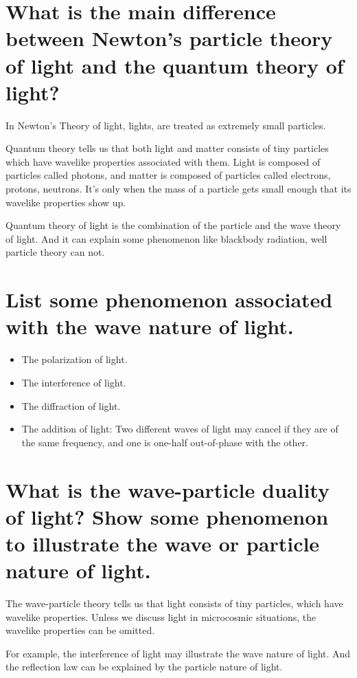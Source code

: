 \documentclass{article}
\begin{document}
\section{What is the main difference between Newton's particle theory of light and the quantum theory of light?}

In Newton's Theory of light, lights, are treated as extremely small particles.

Quantum theory tells us that both light and matter consists of tiny particles which have wavelike properties associated with them. Light is composed of particles called photons, and matter is composed of particles called electrons, protons, neutrons. It's only when the mass of a particle gets small enough that its wavelike properties show up.

Quantum theory of light is the combination of the particle and the wave theory of light. And it can explain some phenomenon like blackbody radiation, well particle theory can not.

\section{List some phenomenon associated with the wave nature of light.}

\begin{itemize}
\item The polarization of light.
\item The interference of light.
\item The diffraction of light.
\item The addition of light: Two different waves of light may cancel if they are of the same frequency, and one is one-half out-of-phase with the other.
  
\end{itemize}

\section{What is the wave-particle duality of light? Show some phenomenon to illustrate the wave or particle nature of light.}

The wave-particle theory tells us that light consists of tiny particles, which have wavelike properties. Unless we discuss light in microcosmic situations, the wavelike properties can be omitted.

For example, the interference of light may illustrate the wave nature of light. And the reflection law can be explained by the particle nature of light.
\end{document}
